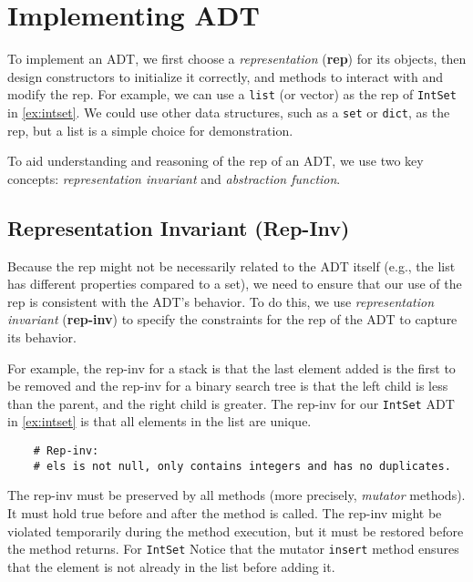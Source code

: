 \documentclass[oneside,11pt,dvipsnames]{book}
\newcommand{\code}[1]{\texttt{#1}}
\begin{document}

\section{Implementing ADT}\label{sec:implementing-adt}

To implement an ADT, we first choose a \emph{representation} (\textbf{rep}) for its objects, then design constructors to initialize it correctly, and methods to interact with and modify the rep. 
For example, we can use a \code{list} (or vector) as the rep of \code{IntSet} in \autoref{ex:intset}. We could use other data structures, such as a \code{set} or \code{dict}, as the rep, but a list is a simple choice for demonstration.


To aid understanding and reasoning of the rep of an ADT, we use two key concepts: \emph{representation invariant} and \emph{abstraction function}.

\subsection{Representation Invariant (Rep-Inv)} Because the rep might not be necessarily related to the ADT itself (e.g., the list has different properties compared to a set), we need to ensure that our use of the rep is consistent with the ADT's behavior. 
To do this, we use \emph{representation invariant} (\textbf{rep-inv}) to specify the constraints for the rep of the ADT to capture its behavior. 

For example, the rep-inv for a stack is that the last element added is the first to be removed and the rep-inv for a binary search tree is that the left child is less than the parent, and the right child is greater. 
The rep-inv for our \code{IntSet} ADT in \autoref{ex:intset} is that all elements in the list are unique. 
\begin{lstlisting}
    # Rep-inv:
    # els is not null, only contains integers and has no duplicates.
\end{lstlisting}

The rep-inv must be preserved by all methods (more precisely, \emph{mutator} methods). It must hold true before and after the method is called. The rep-inv might be violated temporarily during the method execution, but it must be restored before the method returns. For \code{IntSet} Notice that the mutator \code{insert} method ensures that the element is not already in the list before adding it. 
\end{document}
